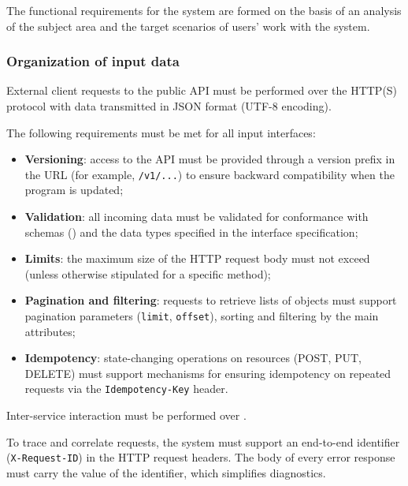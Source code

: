 \documentclass[12pt,a4paper]{extarticle}
\begin{document}


\clearpage

The functional requirements for the system are formed on the basis of an analysis of the subject area and the target scenarios of users' work with the system.

\subsubsection{Organization of input data}
\label{sec:input_data}

\begin{hseExample}
External client requests to the public API must be performed over the HTTP(S) protocol with data transmitted in JSON format (UTF-8 encoding).

The following requirements must be met for all input interfaces:
\begin{itemize}[nosep, leftmargin=1.25cm]
    \item \textbf{Versioning}: access to the API must be provided through a version prefix in the URL (for example, \texttt{/v1/...}) to ensure backward compatibility when the program is updated;
    \item \textbf{Validation}: all incoming data must be validated for conformance with schemas () and the data types specified in the interface specification;
    \item \textbf{Limits}: the maximum size of the HTTP request body must not exceed  (unless otherwise stipulated for a specific method);
    \item \textbf{Pagination and filtering}: requests to retrieve lists of objects must support pagination parameters (\texttt{limit}, \texttt{offset}), sorting and filtering by the main attributes;
    \item \textbf{Idempotency}: state-changing operations on resources (POST, PUT, DELETE) must support mechanisms for ensuring idempotency on repeated requests via the \texttt{Idempotency-Key} header.
\end{itemize}

Inter-service interaction must be performed over .

To trace and correlate requests, the system must support an end-to-end identifier (\texttt{X-Request-ID}) in the HTTP request headers. The body of every error response must carry the value of the identifier, which simplifies diagnostics.
\end{hseExample}
\end{document}
